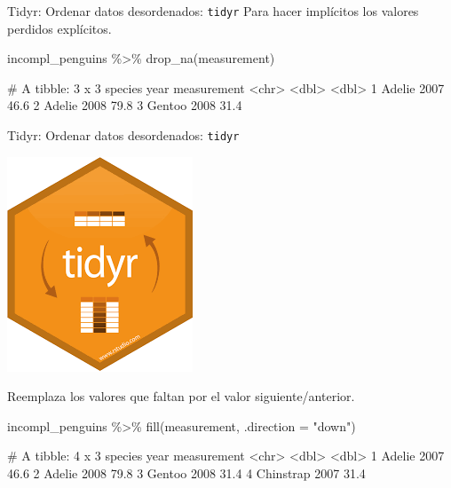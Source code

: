 \documentclass[
  ignorenonframetext,
  aspectratio=169]{beamer}
\newenvironment{Shaded}{\begin{snugshade}}{\end{snugshade}}
\newcommand{\AttributeTok}[1]{\textcolor[rgb]{0.77,0.63,0.00}{#1}}
\newcommand{\FunctionTok}[1]{\textcolor[rgb]{0.00,0.00,0.00}{#1}}
\newcommand{\NormalTok}[1]{#1}
\newcommand{\SpecialCharTok}[1]{\textcolor[rgb]{0.00,0.00,0.00}{#1}}
\newcommand{\StringTok}[1]{\textcolor[rgb]{0.31,0.60,0.02}{#1}}
\let\oldverbatim\verbatim
\let\endoldverbatim\endverbatim
\renewenvironment{verbatim}{\tiny\oldverbatim}{\endoldverbatim}
\begin{document}
\begin{frame}[fragile]{Tidyr: Ordenar datos desordenados:
\texttt{tidyr}}
\protect\hypertarget{tidyr-ordenar-datos-desordenados-tidyr-12}{}
Para hacer implícitos los valores perdidos explícitos.

\begin{Shaded}
\begin{Highlighting}[]
\NormalTok{incompl\_penguins }\SpecialCharTok{\%\textgreater{}\%} 
  \FunctionTok{drop\_na}\NormalTok{(measurement)}
\end{Highlighting}
\end{Shaded}

\begin{verbatim}
# A tibble: 3 x 3
  species  year measurement
  <chr>   <dbl>       <dbl>
1 Adelie   2007        46.6
2 Adelie   2008        79.8
3 Gentoo   2008        31.4
\end{verbatim}
\end{frame}

\begin{frame}[fragile]{Tidyr: Ordenar datos desordenados:
\texttt{tidyr}}
\protect\hypertarget{tidyr-ordenar-datos-desordenados-tidyr-13}{}
\begin{flushright}\includegraphics[width=0.05\linewidth]{Imgs/logo_tidyr} \end{flushright}

Reemplaza los valores que faltan por el valor siguiente/anterior.

\begin{Shaded}
\begin{Highlighting}[]
\NormalTok{incompl\_penguins }\SpecialCharTok{\%\textgreater{}\%} 
  \FunctionTok{fill}\NormalTok{(measurement, }\AttributeTok{.direction =} \StringTok{"down"}\NormalTok{)}
\end{Highlighting}
\end{Shaded}

\begin{verbatim}
# A tibble: 4 x 3
  species    year measurement
  <chr>     <dbl>       <dbl>
1 Adelie     2007        46.6
2 Adelie     2008        79.8
3 Gentoo     2008        31.4
4 Chinstrap  2007        31.4
\end{verbatim}
\end{frame}
\end{document}
